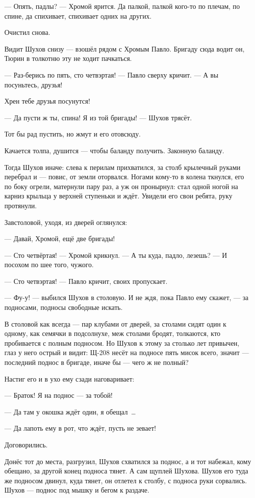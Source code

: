 --- Опять, падлы? --- Хромой ярится. Да палкой, палкой кого-то по плечам, по спине, да спихивает, спихивает одних на других.

Очистил снова.

Видит Шухов снизу --- взошёл рядом с Хромым Павло. Бригаду сюда водит он, Тюрин в толкотню эту не ходит пачкаться.

--- Раз-берись по пять, сто четвэртая! --- Павло сверху кричит. --- А вы посуньтесь, друзья!

Хрен тебе друзья посунутся!

--- Да пусти ж ты, спина! Я из той бригады! --- Шухов трясёт.

Тот бы рад пустить, но жмут и его отовсюду.

Качается толпа, душится --- чтобы баланду получить. Законную баланду.

Тогда Шухов иначе: слева к перилам прихватился, за столб крылечный руками перебрал и --- повис, от земли оторвался. Ногами кому-то в колена ткнулся, его по боку огрели, матернули пару раз, а уж он пронырнул: стал одной ногой на карниз крыльца у верхней ступеньки и ждёт. Увидели его свои ребята, руку протянули.

Завстоловой, уходя, из дверей оглянулся:

--- Давай, Хромой, ещё две бригады!

--- Сто четвёртая! --- Хромой крикнул. --- А ты куда, падло, лезешь? --- И посохом по шее того, чужого.

--- Сто четвэртая! --- Павло кричит, своих пропускает.

--- Фу-у! --- выбился Шухов в столовую. И не ждя, пока Павло ему скажет, --- за подносами, подносы свободные искать.

В столовой как всегда --- пар клубами от дверей, за столами сидят один к одному, как семячки в подсолнухе, меж столами бродят, толкаются, кто пробивается с полным подносом. Но Шухов к этому за столько лет привычен, глаз у него острый и видит: Щ-208 несёт на подносе пять мисок всего, значит --- последний поднос в бригаде, иначе бы --- чего ж не полный?

Настиг его и в ухо ему сзади наговаривает:

--- Браток! Я на поднос --- за тобой!

--- Да там у окошка ждёт один, я обещал~\dots{}

--- Да лапоть ему в рот, что ждёт, пусть не зевает!

Договорились.

Донёс тот до места, разгрузил, Шухов схватился за поднос, а и тот набежал, кому обещано, за другой конец подноса тянет. А сам щуплей Шухова. Шухов его туда же подносом двинул, куда тянет, он отлетел к столбу, с подноса руки сорвались. Шухов --- поднос под мышку и бегом к раздаче.

